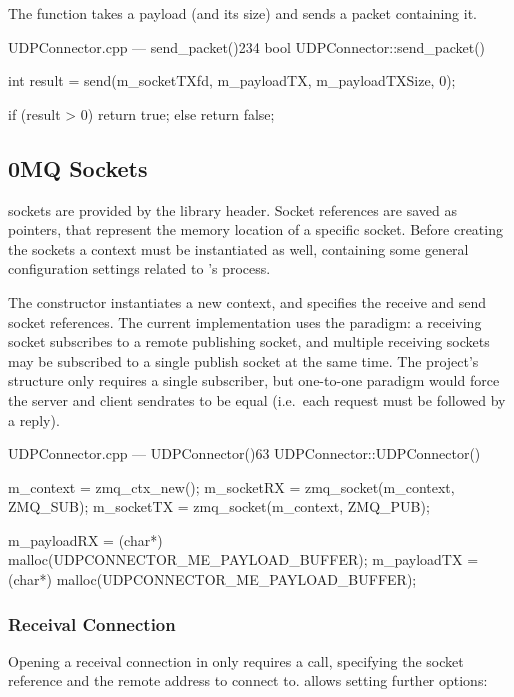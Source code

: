 The  function takes a \gls{payload} (and its size) and sends a \gls{packet} containing it.

\begin{codelist}{UDPConnector.cpp --- send\_packet()}{234}
bool UDPConnector::send_packet() {
	int result = send(m_socketTXfd, m_payloadTX, m_payloadTXSize, 0);

	if (result > 0)
		return true;
	else
		return false;
}
\end{codelist}

\subsection{0MQ Sockets}

 sockets are provided by the  library  header. Socket references are saved as  pointers, that represent the memory location of a specific socket. Before creating the sockets a context must be instantiated as well, containing some general configuration settings related to 's process.

The  constructor instantiates a new context, and specifies the receive and send socket references. The current implementation uses the  paradigm: a receiving socket subscribes to a remote publishing socket, and multiple receiving sockets may be subscribed to a single publish socket at the same time. The project's structure only requires a single subscriber, but  one-to-one paradigm  would force the server and client sendrates to be equal (i.e.\ each request must be followed by a reply).

\begin{codelist}{UDPConnector.cpp --- UDPConnector()}{63}
UDPConnector::UDPConnector() {
	m_context  = zmq_ctx_new();
	m_socketRX = zmq_socket(m_context, ZMQ_SUB);
	m_socketTX = zmq_socket(m_context, ZMQ_PUB);

	m_payloadRX = (char*) malloc(UDPCONNECTOR_ME_PAYLOAD_BUFFER);
	m_payloadTX = (char*) malloc(UDPCONNECTOR_ME_PAYLOAD_BUFFER);
}
\end{codelist}

\subsubsection{Receival Connection}

Opening a receival connection in  only requires a  call, specifying the socket reference and the remote address to connect to.  allows setting further options:

